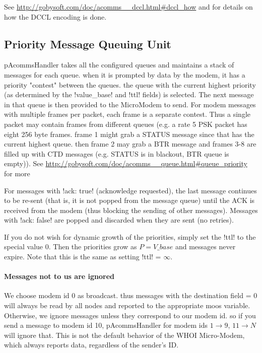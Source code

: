 See \url{http://gobysoft.com/doc/acomms__dccl.html#dccl_how} and \cite{dccl_oceans10} for details on how the DCCL encoding is done.

\subsection{Priority Message Queuing Unit}

pAcommsHandler takes all the configured queues and maintains a stack of messages for each queue. when it is prompted by data by the modem, it has a priority "contest" between the queues. the queue with the current highest priority (as determined by the !value_base! and !ttl! fields) is selected. The next message in that queue is then provided to the MicroModem to send. For modem messages with multiple frames per packet, each frame is a separate contest. Thus a single packet may contain frames from different
 queues (e.g. a rate 5 PSK packet has eight 256 byte frames. frame 1 might grab a STATUS message since that has the current highest queue. then frame 2 may grab a BTR message and frames 3-8 are filled up with CTD messages (e.g. STATUS is in blackout, BTR queue is empty)). See \url{http://gobysoft.com/doc/acomms__queue.html#queue_priority} for more

For messages with !ack: true! (acknowledge requested), the last message continues to be re-sent (that is, it is not popped from the message queue) until the ACK is received from the modem (thus blocking the sending of other messages). Messages with !ack: false! are popped and discarded when they are sent (no retries).

If you do not wish for dynamic growth of the priorities, simply set the !ttl! to the special value 0. Then the priorities grow as $P = V\_{base}$ and messages never expire. Note that this is the same as setting !ttl! = $\infty$.

\paragraph{Messages not to us are ignored} We choose modem id 0 as broadcast. thus messages with the destination field = 0 will always be read by all nodes and reported to the
  appropriate moos variable. Otherwise, we ignore messages unless they correspond to our modem id. so if you send a message to modem id 10, pAcommsHandler for modem ids $1 \rightarrow 9$, $11\rightarrow N$  will ignore that. This is not the default behavior of the WHOI Micro-Modem, which always reports data, regardless of the sender's ID.
  
